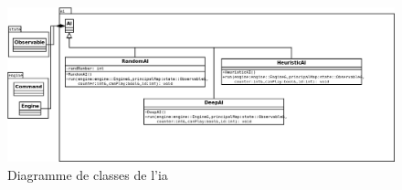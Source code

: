 \documentclass[12pt,a4paper]{article}
\begin{document}
\begin{figure}[!ht]
\centering
    \includegraphics[width=1\textwidth]{ressources/ai.png}
     \caption{Diagramme de classes de l'ia}
\end{figure}
\end{document}
